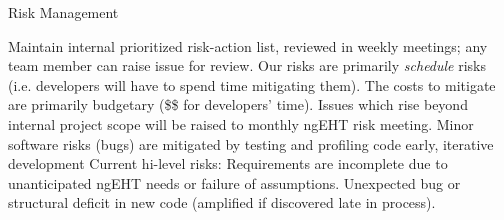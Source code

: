 \documentclass[8pt]{beamer}
\begin{document}











\begin{frame}{Risk Management}

\begin{outline}
    \1 Maintain internal prioritized risk-action list, reviewed in weekly meetings; any team member can raise issue for review.
    \1 Our risks are primarily \emph{schedule} risks (i.e. developers will have to spend time mitigating them). The costs to mitigate are primarily budgetary (\$\$ for developers' time).
    \2 Issues which rise beyond internal project scope will be raised to monthly ngEHT risk meeting.
    \2 Minor software risks (bugs) are mitigated by testing and profiling code early, iterative development
    \1 Current hi-level risks:
        \2 Requirements are incomplete due to unanticipated ngEHT needs or failure of assumptions.
        \2 Unexpected bug or structural deficit in new code (amplified if discovered late in process).
\end{outline}

\end{frame}
\end{document}
